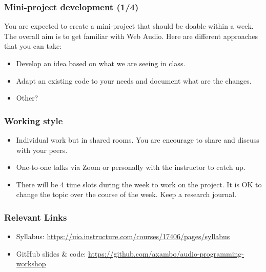 \documentclass[screen, aspectratio=43]{beamer}
\begin{document}
%
\begin{frame}
\frametitle{Mini-project development (1/4)}
You are expected to create a mini-project that should be doable within a week. The overall aim is to get familiar with Web Audio. Here are different approaches that you can take:
\begin{itemize}
\item Develop an idea based on what we are seeing in class.
\item Adapt an existing code to your needs and document what are the changes.
\item Other?
\end{itemize}
\end{frame}
%
\begin{frame}
\frametitle{Working style}
\begin{itemize}
\item Individual work but in shared rooms. You are encourage to share and discuss with your peers.
\item One-to-one talks via Zoom or personally with the instructor to catch up.
\item There will be 4 time slots during the week to work on the project. It is OK to change the topic over the course of the week. Keep a research journal.
\end{itemize}
\end{frame}
%
\begin{frame}
\frametitle{Relevant Links}
\begin{itemize}
\item Syllabus: \url{https://uio.instructure.com/courses/17406/pages/syllabus}
\item GitHub slides \& code: \url{https://github.com/axambo/audio-programming-workshop}
\end{itemize}
\end{frame}
%
%
\end{document}
